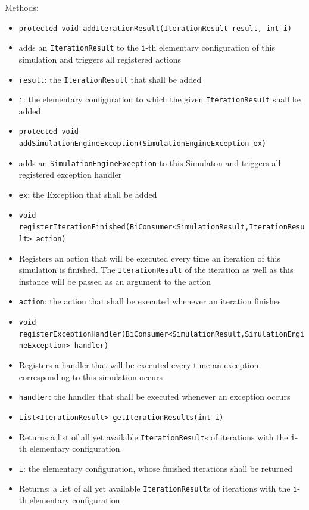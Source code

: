 \documentclass[parskip=full,11pt]{scrartcl}
\begin{document}
Methods:
\begin{itemize}\itemsep -10pt
	\item \texttt{protected void addIterationResult(IterationResult result, int i)}
	\item[] adds an \texttt{IterationResult} to the \texttt{i}-th elementary configuration of this simulation and triggers all registered actions
	\item[] \texttt{result}: the \texttt{IterationResult} that shall be added
	\item[] \texttt{i}: the elementary configuration to which the given \texttt{IterationResult} shall be added
	
	\item \texttt{protected void addSimulationEngineException(SimulationEngineException ex)}
	\item[] adds an \texttt{SimulationEngineException} to this Simulaton and triggers all registered exception handler
	\item[] \texttt{ex}: the Exception that shall be added	
	
	\item \texttt{void registerIterationFinished(BiConsumer<SimulationResult,IterationResult> action)}
	\item[] Registers an action that will be executed every time an iteration of this simulation is finished. The \texttt{IterationResult} of the iteration as well as this instance will be passed as an argument to the action
	\item[] \texttt{action}: the action that shall be executed whenever an iteration finishes
	
	\item \texttt{void registerExceptionHandler(BiConsumer<SimulationResult,SimulationEngineException> handler)}
	\item[] Registers a handler that will be executed every time an exception corresponding to this simulation occurs
	\item[] \texttt{handler}: the handler that shall be executed whenever an exception occurs
	
	\item \texttt{List<IterationResult> getIterationResults(int i)}
	\item[] Returns a list of all yet available \texttt{IterationResult}s of iterations with the \texttt{i}-th elementary configuration.
	\item[] \texttt{i}: the elementary configuration, whose finished iterations shall be returned
	\item[] Returns: a list of all yet available \texttt{IterationResult}s of iterations with the \texttt{i}-th elementary configuration
	

\end{itemize}
\end{document}
